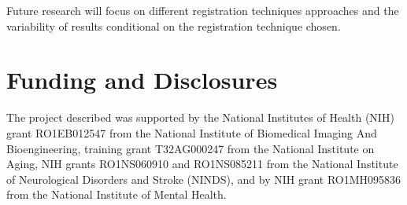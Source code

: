 \documentclass[10pt]{article}\usepackage[]{graphicx}\usepackage[]{color}
\begin{document}
Future research will focus on different registration techniques approaches and the variability of results conditional on the registration technique chosen. 












\section{Funding and Disclosures}
The project described was supported by the National Institutes of Health (NIH) grant RO1EB012547 from the National Institute of Biomedical Imaging And Bioengineering, training grant T32AG000247 from the National Institute on Aging, NIH grants RO1NS060910 and  RO1NS085211 from the National Institute of Neurological Disorders and Stroke (NINDS), and by NIH grant RO1MH095836 from the National Institute of Mental Health. 
\end{document}
